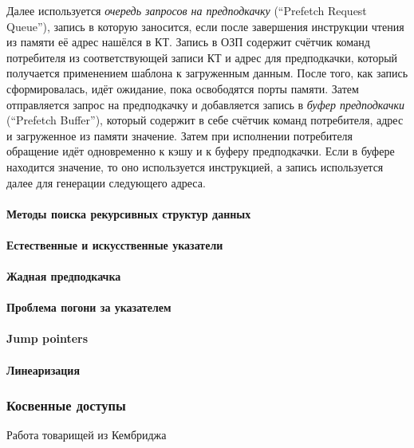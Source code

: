\documentclass[12pt,a4paper]{article}
\begin{document}
Далее используется \emph{очередь запросов на предподкачку} (``Prefetch Request Queue''), запись в которую заносится, если после завершения инструкции чтения из памяти её адрес нашёлся в КТ. Запись в ОЗП содержит счётчик команд потребителя из соответствующей записи КТ и адрес для предподкачки, который получается применением шаблона к загруженным данным. После того, как запись сформировалась, идёт ожидание, пока освободятся порты памяти. Затем отправляется запрос на предподкачку и добавляется запись в \emph{буфер предподкачки} (``Prefetch Buffer''), который содержит в себе счётчик команд потребителя, адрес и загруженное из памяти значение. Затем при исполнении потребителя обращение идёт одновременно к кэшу и к буферу предподкачки. Если в буфере находится значение, то оно используется инструкцией, а запись используется далее для генерации следующего адреса.

\paragraph{Методы поиска рекурсивных структур данных}

\paragraph{Естественные и искусственные указатели}

\paragraph{Жадная предподкачка}

\paragraph{Проблема погони за указателем}

\paragraph{Jump pointers}

\paragraph{Линеаризация}

\subsubsection{Косвенные доступы}
Работа товарищей из Кембриджа
\end{document}
